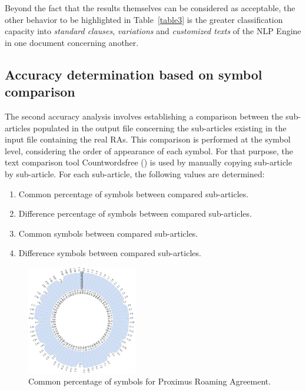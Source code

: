 Beyond the fact that the results themselves can be considered as acceptable, the other behavior to be highlighted in Table~\ref{table3} is the greater classification capacity into \textit{standard clauses}, \textit{variations} and \textit{customized texts} of the NLP Engine in one document concerning another.

\subsection{Accuracy determination based on symbol comparison}
The second accuracy analysis involves establishing a comparison between the sub-articles populated in the output file concerning the sub-articles existing in the input file containing the real RAs. This comparison is performed at the symbol level, considering the order of appearance of each symbol. For that purpose, the text comparison tool Countwordsfree (\cite{countwordsfree}) is used by manually copying sub-article by sub-article. For each sub-article, the following values are determined:

\begin{enumerate}
\item Common percentage of symbols between compared sub-articles.
\item Difference percentage of symbols between compared sub-articles.
\item Common symbols between compared sub-articles.
\item Difference symbols between compared sub-articles.
\end{enumerate}

\begin{figure}[htbp]
\centerline{\includegraphics[width=0.43\textwidth]{images/Proximus.png}}
\caption{Common percentage of symbols for Proximus Roaming Agreement.}
\label{fig3}
\end{figure}

